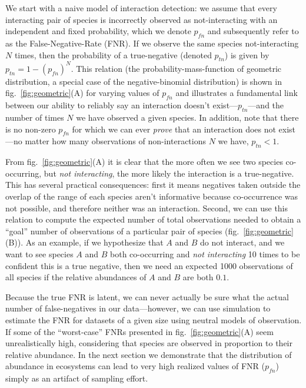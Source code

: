 \documentclass[11pt]{article}
\begin{document}
We start with a naive model of interaction detection: we assume that
every interacting pair of species is incorrectly observed as
not-interacting with an independent and fixed probability, which we
denote \(p_{fn}\) and subsequently refer to as the False-Negative-Rate
(FNR). If we observe the same species not-interacting \(N\) times, then
the probability of a true-negative (denoted \(p_{tn}\)) is given by
\(p_{tn}=1-(p_{fn})^N\). This relation (the probability-mass-function of
geometric distribution, a special case of the negative-binomial
distribution) is shown in fig.~\ref{fig:geometric}(A) for varying values
of \(p_{fn}\) and illustrates a fundamental link between our ability to
reliably say an interaction doesn't exist---\(p_{tn}\)---and the number
of times \(N\) we have observed a given species. In addition, note that
there is no non-zero \(p_{fn}\) for which we can ever \emph{prove} that
an interaction does not exist---no matter how many observations of
non-interactions \(N\) we have, \(p_{tn}<1\).

From fig.~\ref{fig:geometric}(A) it is clear that the more often we see
two species co-occurring, but \emph{not interacting}, the more likely
the interaction is a true-negative. This has several practical
consequences: first it means negatives taken outside the overlap of the
range of each species aren't informative because co-occurrence was not
possible, and therefore neither was an interaction. Second, we can use
this relation to compute the expected number of total observations
needed to obtain a ``goal'' number of observations of a particular pair
of species (fig.~\ref{fig:geometric}(B)). As an example, if we
hypothesize that \(A\) and \(B\) do not interact, and we want to see
species \(A\) and \(B\) both co-occurring and \emph{not interacting} 10
times to be confident this is a true negative, then we need an expected
1000 observations of all species if the relative abundances of \(A\) and
\(B\) are both \(0.1\).

Because the true FNR is latent, we can never actually be sure what the
actual number of false-negatives in our data---however, we can use
simulation to estimate the FNR for datasets of a given size using
neutral models of observation. If some of the ``worst-case'' FNRs
presented in fig.~\ref{fig:geometric}(A) seem unrealistically high,
considering that species are observed in proportion to their relative
abundance. In the next section we demonstrate that the distribution of
abundance in ecosystems can lead to very high realized values of FNR
(\(p_{fn}\)) simply as an artifact of sampling effort.
\end{document}
